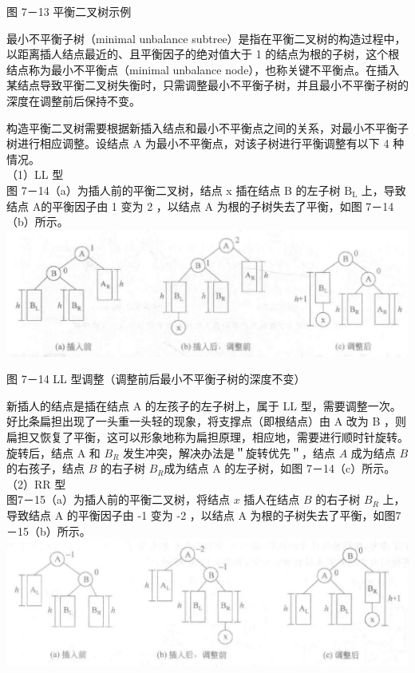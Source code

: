 \documentclass[10pt]{article}
\begin{document}
图 7－13 平衡二叉树示例

最小不平衡子树（minimal unbalance subtree）是指在平衡二叉树的构造过程中，以距离插人结点最近的、且平衡因子的绝对值大于 1 的结点为根的子树，这个根结点称为最小不平衡点（minimal unbalance node），也称关键不平衡点。在插入某结点导致平衡二叉树失衡时，只需调整最小不平衡子树，并且最小不平衡子树的深度在调整前后保持不变。

构造平衡二叉树需要根据新插入结点和最小不平衡点之间的关系，对最小不平衡子树进行相应调整。设结点 A 为最小不平衡点，对该子树进行平衡调整有以下 4 种情况。\\
（1）LL 型\\
图 7－14（a）为插人前的平衡二叉树，结点 x 插在结点 B 的左子树 $\mathrm{B}_{\mathrm{L}}$ 上，导致结点 A的平衡因子由 1 变为 2 ，以结点 A 为根的子树失去了平衡，如图 7－14（b）所示。\\
\includegraphics[max width=\textwidth, center]{2025_06_06_704745ea57b15b2333e5g-245(1)}

图 7－14 LL 型调整（调整前后最小不平衡子树的深度不变）

新插人的结点是插在结点 A 的左孩子的左子树上，属于 LL 型，需要调整一次。好比条扁担出现了一头重一头轻的现象，将支撑点（即根结点）由 A 改为 B ，则扁担又恢复了平衡，这可以形象地称为扁担原理，相应地，需要进行顺时针旋转。旋转后，结点 A 和 $B_{R}$ 发生冲突，解决办法是＂旋转优先＂，结点 $A$ 成为结点 $B$ 的右孩子，结点 $B$ 的右子树 $B_{R}$成为结点 A 的左子树，如图 7－14（c）所示。\\
（2）RR 型\\
图7－15（a）为插人前的平衡二叉树，将结点 $x$ 插人在结点 $B$ 的右子树 $B_{R}$ 上，导致结点 A 的平衡因子由 -1 变为 -2 ，以结点 A 为根的子树失去了平衡，如图7－15（b）所示。\\
\includegraphics[max width=\textwidth, center]{2025_06_06_704745ea57b15b2333e5g-246}
\end{document}
